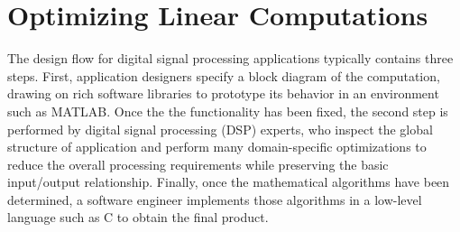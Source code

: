 




\section{Optimizing Linear Computations}

The design flow for digital signal processing applications typically
contains three steps.  First, application designers specify a block
diagram of the computation, drawing on rich software libraries to
prototype its behavior in an environment such as MATLAB.  Once the the
functionality has been fixed, the second step is performed by digital
signal processing (DSP) experts, who inspect the global structure of
application and perform many domain-specific optimizations to reduce
the overall processing requirements while preserving the basic
input/output relationship.  Finally, once the mathematical algorithms
have been determined, a software engineer implements those algorithms
in a low-level language such as C to obtain the final product.

